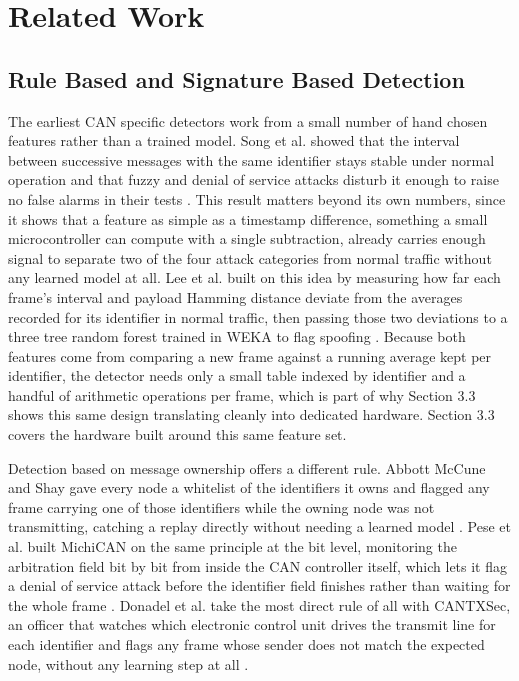 \documentclass[11pt]{article}
\begin{document}
\section{Related Work}

\subsection{Rule Based and Signature Based Detection}

The earliest CAN specific detectors work from a small number of hand chosen features rather than a trained model. Song et al. showed that the interval between successive messages with the same identifier stays stable under normal operation and that fuzzy and denial of service attacks disturb it enough to raise no false alarms in their tests \cite{song2016icoin}. This result matters beyond its own numbers, since it shows that a feature as simple as a timestamp difference, something a small microcontroller can compute with a single subtraction, already carries enough signal to separate two of the four attack categories from normal traffic without any learned model at all. Lee et al. built on this idea by measuring how far each frame's interval and payload Hamming distance deviate from the averages recorded for its identifier in normal traffic, then passing those two deviations to a three tree random forest trained in WEKA to flag spoofing \cite{lee2023iceic}. Because both features come from comparing a new frame against a running average kept per identifier, the detector needs only a small table indexed by identifier and a handful of arithmetic operations per frame, which is part of why Section 3.3 shows this same design translating cleanly into dedicated hardware. Section 3.3 covers the hardware built around this same feature set.

Detection based on message ownership offers a different rule. Abbott McCune and Shay gave every node a whitelist of the identifiers it owns and flagged any frame carrying one of those identifiers while the owning node was not transmitting, catching a replay directly without needing a learned model \cite{abbottmccune2016}. Pese et al. built MichiCAN on the same principle at the bit level, monitoring the arbitration field bit by bit from inside the CAN controller itself, which lets it flag a denial of service attack before the identifier field finishes rather than waiting for the whole frame \cite{pese2025michican}. Donadel et al. take the most direct rule of all with CANTXSec, an officer that watches which electronic control unit drives the transmit line for each identifier and flags any frame whose sender does not match the expected node, without any learning step at all \cite{donadel2025}.
\end{document}
